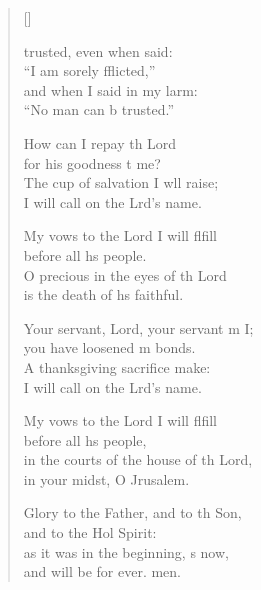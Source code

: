 \settowidth{\versewidth}{in the courts of the house of the Lord,  *}
\begin{verse}[\versewidth]
  \begin{patverse}
     trusted, even when  said: \Med\\
    “I am sorely fflicted,”\\
    and when I said in my larm: \Med\\
    “No man can b trusted.”
    
    How can I repay th Lord \Med\\
    for his goodness t me?\\
    The cup of salvation I w\pointup{\i}ll raise; \Med\\
    I will call on the Lrd’s name.
    
    My vows to the Lord I will flfill \Med\\
    before all h\pointup{\i}s people.\\
    O precious in the eyes of th Lord \Med\\
    is the death of h\pointup{\i}s faithful.

    Your servant, Lord, your servant m I; \Med\\
    you have loosened m bonds.\\
    A thanksgiving sacrifice  make: \Med\\
    I will call on the Lrd’s name.

    My vows to the Lord I will flfill \Med\\
    before all h\pointup{\i}s people,\\
    in the courts of the house of th Lord, \Med\\
    in your midst, O Jrusalem.

    Glory to the Father, and to th Son, \Med\\
    and to the Hol Spirit:\\
    as it was in the beginning, \pointup{\i}s now, \Med\\
    and will be for ever. men.
  \end{patverse}
\end{verse}
